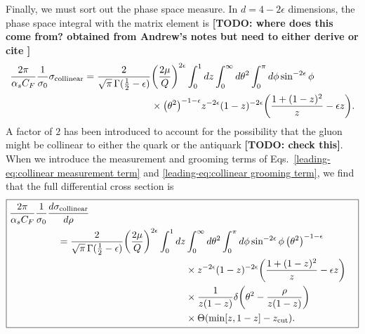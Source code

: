\documentclass[../thesis.tex]{subfiles}
\providecommand{\zcut}{z_\mathrm{{cut}}}
\begin{document}
	Finally, we must sort out the phase space measure. In $d = 4 - 2\epsilon$ dimensions, the phase space integral with the matrix element is {\color{red}\textbf{[TODO: where does this come from? obtained from Andrew's notes but need to either derive or cite \cite{ellis_qcd_1996}]}}
	\begin{equation}
	\begin{aligned}
		\frac{2\pi}{\alpha_s C_F} \frac{1}{\sigma_0}\sigma_{\text{collinear}} = \frac{2}{\sqrt{\pi}\,\Gamma(\frac{1}{2} - \epsilon)} &\qty(\frac{2\mu}{Q})^{2\epsilon} \int_0^1 dz \int_0^\infty d\theta^2 \int_0^{\pi} d\phi \sin^{-2\epsilon}\phi  \\
			&\times \qty(\theta^2)^{-1-\epsilon} z^{-2\epsilon} (1 - z)^{-2\epsilon} \qty(\frac{1 + (1 - z)^2}{z} - \epsilon z).
	\end{aligned}
	\end{equation}
	A factor of $2$ has been introduced to account for the possibility that the gluon might be collinear to either the quark or the antiquark {\color{red}\textbf{[TODO: check this]}}. When we introduce the measurement and grooming terms of Eqs.~\ref{leading-eq:collinear measurement term} and \ref{leading-eq:collinear grooming term}, we find that the full differential cross section is
	\begin{equation}\label{leading-eq:collinear integral}
	\boxed{
	\begin{aligned}
		\frac{2\pi}{\alpha_s C_F} \frac{1}{\sigma_0}\frac{d\sigma_{\text{collinear}}}{d\rho}\hspace{3.5cm} \\
		= \frac{2}{\sqrt{\pi}\,\Gamma(\frac{1}{2} - \epsilon)} \qty(\frac{2\mu}{Q})^{2\epsilon} \int_0^1 dz &\int_0^\infty d\theta^2 \int_0^{\pi} d\phi \sin^{-2\epsilon}\phi\,\qty(\theta^2)^{-1-\epsilon} \\
			&\times  z^{-2\epsilon} (1 - z)^{-2\epsilon} \qty(\frac{1 + (1 - z)^2}{z} - \epsilon z)\\
			&\times \frac{1}{z(1 - z)}\delta\qty(\theta^2 - \frac{\rho}{z(1 - z)}) \\
			&\times\Theta\qty(\min[z, 1 - z] - \zcut).
	\end{aligned}
	}
	\end{equation}
\end{document}
